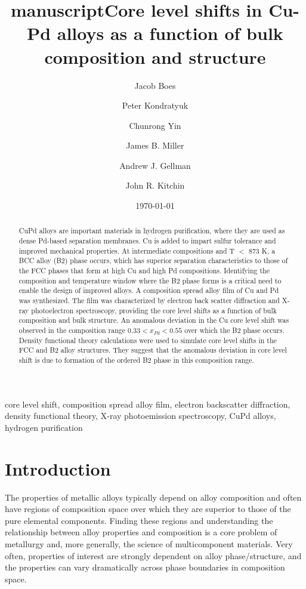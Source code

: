 \documentclass[number, sort&compress, review, 12pt]{elsarticle}
\date{\today}
\title{manuscript}
\begin{document}
\begin{frontmatter}
\title{Core level shifts in Cu-Pd alloys as a function of bulk composition and structure}

\author[cmu]{Jacob Boes}
\author[cmu]{Peter Kondratyuk}
\author[cmu]{Chunrong Yin}
\author[cmu]{James B. Miller}
\author[cmu]{Andrew J. Gellman}
\author[cmu]{John R. Kitchin}

\address[cmu]{Department of Chemical Engineering, Carnegie Mellon University, Pittsburgh, PA 15213}


\begin{abstract}
CuPd alloys are important materials in hydrogen purification, where they are used as dense Pd-based separation membranes. Cu is added to impart sulfur tolerance and improved mechanical properties. At intermediate compositions and T $<$ 873 K, a BCC alloy (B2) phase occurs, which has superior separation characteristics to those of the FCC phases that form at high Cu and high Pd compositions. Identifying the composition and temperature window where the B2 phase forms is a critical need to enable the design of improved alloys. A composition spread alloy film of Cu and Pd was synthesized. The film was characterized by electron back scatter diffraction and X-ray photoelectron spectroscopy, providing the core level shifts as a function of bulk composition and bulk structure. An anomalous deviation in the Cu core level shift was observed in the composition range $0.33 < x_{Pd} < 0.55$ over which the B2 phase occurs. Density functional theory calculations were used to simulate core level shifts in the FCC and B2 alloy structures. They suggest that the anomalous deviation in core level shift is due to formation of the ordered B2 phase in this composition range.
\end{abstract}

\begin{keyword}
core level shift, composition spread alloy film, electron backscatter diffraction, density functional theory, X-ray photoemission spectroscopy, CuPd alloys, hydrogen purification
\end{keyword}
\end{frontmatter}

\section{Introduction}
\label{sec-1}
The properties of metallic alloys typically depend on alloy composition and often have regions of composition space over which they are superior to those of the pure elemental components.  Finding these regions and understanding the relationship between alloy properties and composition is a core problem of metallurgy and, more generally, the science of multicomponent materials. Very often, properties of interest are strongly dependent on alloy phase/structure, and the properties can vary dramatically across phase boundaries in composition space.
\end{document}
